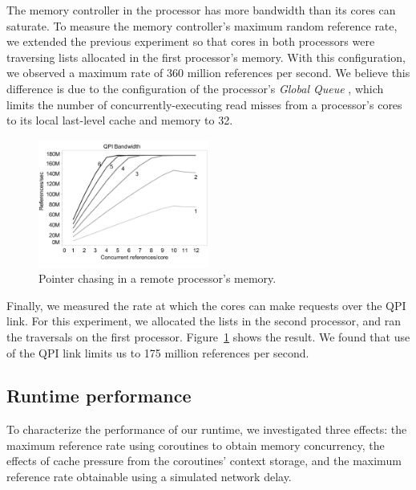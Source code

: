 \documentclass{acm_proc_article-sp}
\begin{document}
The memory controller in the processor has more bandwidth than its
cores can saturate. To measure the memory controller's maximum random
reference rate, we extended the previous experiment so that cores in
both processors were traversing lists allocated in the first processor's
memory. With this configuration, we observed a maximum rate of 360
million references per second. We believe this difference is due to
the configuration of the processor's {\em Global Queue} , which limits the number of concurrently-executing read misses
from a processor's cores to its local last-level cache and memory to 32.

\begin{figure}[h]
  \begin{center}
    \includegraphics[width=0.5\textwidth]{figures/qpi_bw-edited.pdf}
  \end{center}
  \caption{Pointer chasing in a remote processor's memory.}
  \label{fig:listwalk-qpi}
\end{figure}

Finally, we measured the rate at which the cores can make requests
over the QPI link. For this experiment, we allocated the lists in the
second processor, and ran the traversals on the first
processor. Figure~\ref{fig:listwalk-qpi} shows the result. We found that use
of the QPI link limits us to 175 million references per second.

\subsection{Runtime performance}

To characterize the performance of our runtime, we investigated three
effects: the maximum reference rate using coroutines
to obtain memory concurrency, the effects of cache pressure from the
coroutines' context storage, and the maximum reference rate obtainable
using a simulated network delay.
\end{document}
